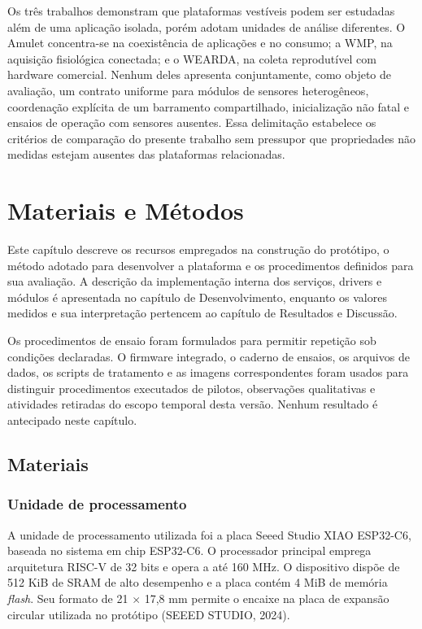 \documentclass[a4paper,12pt]{article}
\begin{document}
Os tr\^es trabalhos demonstram que plataformas vest\'iveis podem ser estudadas al\'em de uma aplica\c{c}\~ao isolada, por\'em adotam unidades de an\'alise diferentes. O Amulet concentra-se na coexist\^encia de aplica\c{c}\~oes e no consumo; a WMP, na aquisi\c{c}\~ao fisiol\'ogica conectada; e o WEARDA, na coleta reprodut\'ivel com hardware comercial. Nenhum deles apresenta conjuntamente, como objeto de avalia\c{c}\~ao, um contrato uniforme para m\'odulos de sensores heterog\^eneos, coordena\c{c}\~ao expl\'icita de um barramento compartilhado, inicializa\c{c}\~ao n\~ao fatal e ensaios de opera\c{c}\~ao com sensores ausentes. Essa delimita\c{c}\~ao estabelece os crit\'erios de compara\c{c}\~ao do presente trabalho sem pressupor que propriedades n\~ao medidas estejam ausentes das plataformas relacionadas.

\clearpage
\section{Materiais e M\'etodos}


Este cap\'itulo descreve os recursos empregados na constru\c{c}\~ao do prot\'otipo, o m\'etodo adotado para desenvolver a plataforma e os procedimentos definidos para sua avalia\c{c}\~ao. A descri\c{c}\~ao da implementa\c{c}\~ao interna dos servi\c{c}os, drivers e m\'odulos \'e apresentada no cap\'itulo de Desenvolvimento, enquanto os valores medidos e sua interpreta\c{c}\~ao pertencem ao cap\'itulo de Resultados e Discuss\~ao.


Os procedimentos de ensaio foram formulados para permitir repeti\c{c}\~ao sob condi\c{c}\~oes declaradas. O firmware integrado, o caderno de ensaios, os arquivos de dados, os scripts de tratamento e as imagens correspondentes foram usados para distinguir procedimentos executados de pilotos, observa\c{c}\~oes qualitativas e atividades retiradas do escopo temporal desta vers\~ao. Nenhum resultado \'e antecipado neste cap\'itulo.


\subsection{Materiais}


\subsubsection{Unidade de processamento}


A unidade de processamento utilizada foi a placa Seeed Studio XIAO ESP32-C6, baseada no sistema em chip ESP32-C6. O processador principal emprega arquitetura RISC-V de 32 bits e opera a at\'e 160 MHz. O dispositivo disp\~oe de 512 KiB de SRAM de alto desempenho e a placa cont\'em 4 MiB de mem\'oria \emph{flash}. Seu formato de 21 $\times$ 17,8 mm permite o encaixe na placa de expans\~ao circular utilizada no prot\'otipo (SEEED STUDIO, 2024).
\end{document}
